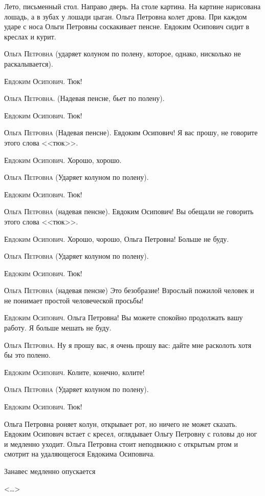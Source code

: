 Лето, письменный стол. Направо дверь. На столе картина. На картине нарисована лошадь, а в зубах у лошади цыган. Ольга Петровна колет дрова. При каждом ударе с носа Ольги Петровны соскакивает пенсне. Евдоким Осипович сидит в креслах и курит.

\textsc{Ольга Петровна} (ударяет колуном по полену, которое, однако, нисколько не раскалывается).

\textsc{Евдоким Осипович}. Тюк!

\textsc{Ольга Петровна}. (Надевая пенсне, бьет по полену).

\textsc{Евдоким Осипович}. Тюк!

\textsc{Ольга Петровна} (Надевая пенсне). Евдоким Осипович! Я вас прошу, не говорите этого слова <<тюк>>.

\textsc{Евдоким Осипович}. Хорошо, хорошо.

\textsc{Ольга Петровна} (Ударяет колуном по полену).

\textsc{Евдоким Осипович}. Тюк!

\textsc{Ольга Петровна} (надевая пенсне). Евдоким Осипович! Вы обещали не говорить этого слова <<тюк>>.

\textsc{Евдоким Осипович}. Хорошо, чорошо, Ольга Петровна! Больше не буду.

\textsc{Ольга Петровна} (Ударяет колуном по полену).

\textsc{Евдоким Осипович}. Тюк!

\textsc{Ольга Петровна} (надевая пенсне) Это безобразие! Взрослый пожилой человек и не понимает простой человеческой просьбы!

\textsc{Евдоким Осипович}. Ольга Петровна! Вы можете спокойно продолжать вашу работу. Я больше мешать не буду.

\textsc{Ольга Петровна}. Ну я прошу вас, я очень прошу вас: дайте мне расколоть хотя бы это полено.

\textsc{Евдоким Осипович}. Колите, конечно, колите!

\textsc{Ольга Петровна} (Ударяет колуном по полену).

\textsc{Евдоким Осипович}. Тюк!

Ольга Петровна роняет колун, открывает рот, но ничего не может сказать. Евдоким Осипович встает с кресел, оглядывает Ольгу Петровну с головы до ног и медленно уходит. Ольга Петровна стоит неподвижно с открытым ртом и смотрит на удаляющегося Евдокима Осиповича.

\centerline{Занавес медленно опускается}

\begin{flushright} <\dots> \end{flushright}
